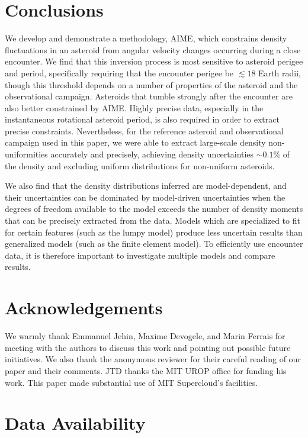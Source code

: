 \documentclass[fleqn,usenatbib]{mnras}
\begin{document}
\section{Conclusions}

We develop and demonstrate a methodology, AIME, which constrains density fluctuations in an asteroid from angular velocity changes occurring during a close encounter. We find that this inversion process is most sensitive to asteroid perigee and period, specifically requiring that the encounter perigee be $\lesssim 18$ Earth radii, though this threshold depends on a number of properties of the asteroid and the observational campaign. Asteroids that tumble strongly after the encounter are also better constrained by AIME. Highly precise data, especially in the instantaneous rotational asteroid period, is also required in order to extract precise constraints.  Nevertheless, for the reference asteroid and observational campaign used in this paper, we were able to extract large-scale density non-uniformities accurately and precisely, achieving density uncertainties $\sim 0.1\%$ of the density and excluding uniform distributions for non-uniform asteroids.

We also find that the density distributions inferred are model-dependent, and their uncertainties can be dominated by model-driven uncertainties when the degrees of freedom available to the model exceeds the number of density moments that can be precisely extracted from the data. Models which are specialized to fit for certain features (such as the lumpy model) produce less uncertain results than generalized models (such as the finite element model). To efficiently use encounter data, it is therefore important to investigate multiple models and compare results.



\section*{Acknowledgements}

We warmly thank Emmanuel Jehin, Maxime Devogele, and Marin Ferrais for meeting with the authors to discuss this work and pointing out possible future initiatives. We also thank the anonymous reviewer for their careful reading of our paper and their comments. JTD thanks the MIT UROP office for funding his work. This paper made substantial use of MIT Supercloud's facilities.


\section*{Data Availability}
\end{document}
